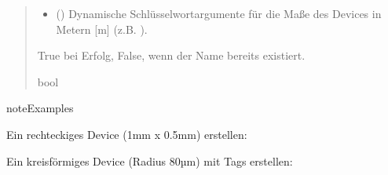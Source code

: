 \documentclass[letterpaper,10pt,english]{sphinxmanual}
\begin{document}
\begin{fulllineitems}
\begin{fulllineitems}
\begin{quote}
\begin{description}
\begin{itemize}
\item {} 
\sphinxAtStartPar
{} () \textendash{} Dynamische Schlüsselwortargumente für die Maße
des Devices in Metern {[}m{]} (z.B. ).

\end{itemize}

\sphinxAtStartPar
True bei Erfolg, False, wenn der Name bereits existiert.

\sphinxAtStartPar
bool

\end{description}\end{quote}

\begin{sphinxadmonition}{note}{Examples}

\sphinxAtStartPar
Ein rechteckiges Device (1mm x 0.5mm) erstellen:

\begin{sphinxVerbatim}[commandchars=\\\{\}]
\end{sphinxVerbatim}

\sphinxAtStartPar
Ein kreisförmiges Device (Radius 80µm) mit Tags erstellen:

\begin{sphinxVerbatim}[commandchars=\\\{\}]
    \PYG{p}{[} \PYG{p}{]}
\end{sphinxVerbatim}
\end{sphinxadmonition}


\end{fulllineitems}
\end{fulllineitems}
\end{document}
